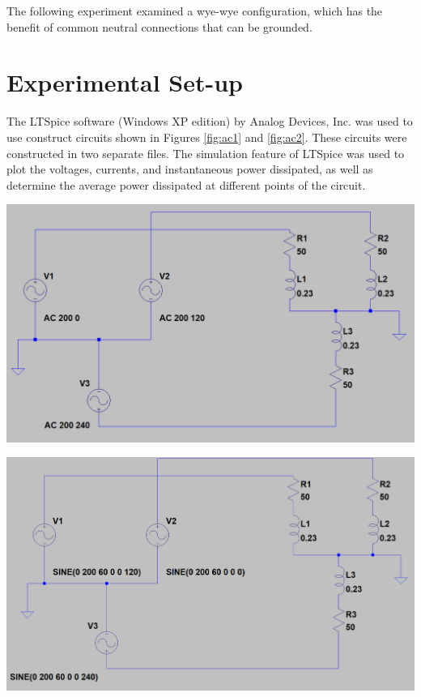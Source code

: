\documentclass[journal]{IEEEtran}
\begin{document}
\noindent The following experiment examined a wye-wye configuration, which has the benefit of common neutral connections that can be grounded.


\section{Experimental Set-up}

\noindent The LTSpice software (Windows XP edition) by Analog Devices, Inc. was used to use construct circuits shown in Figures \ref{fig:ac1} and \ref{fig:ac2}. These circuits were constructed in two separate files. The simulation feature of LTSpice was used to plot the voltages, currents, and instantaneous power dissipated, as well as determine the average power dissipated at different points of the circuit.

\begingroup
    \centering
    \medskip
    \includegraphics[width=\columnwidth]{images/lab9_2.png}
    \label{fig:ac1}
    \medskip
\endgroup

\begingroup
    \centering
    \medskip
    \includegraphics[width=\columnwidth]{images/lab9_1.png}
    \label{fig:ac2}
    \medskip
\endgroup
\end{document}
